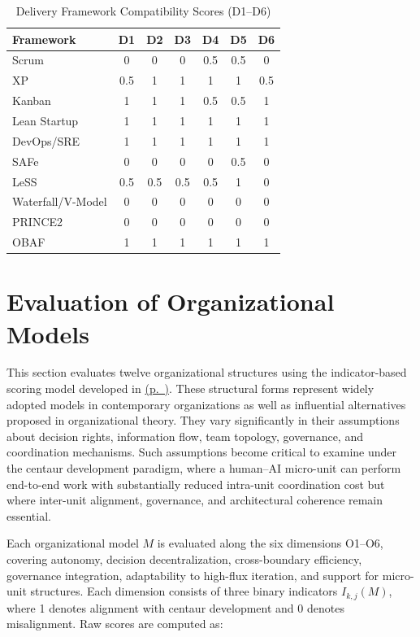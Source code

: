 \documentclass[11pt, a4paper, twocolumn]{article} %
\newcommand{\namerefp}[1]{\hyperref[#1]{\nameref{#1} (p.~\pageref{#1})}}
\begin{document}
\begin{table}[h]
\centering
\caption{Delivery Framework Compatibility Scores (D1--D6)}
\label{tab:delivery-scores}
\begin{tabular}{lcccccc}
\toprule
\textbf{Framework} & D1 & D2 & D3 & D4 & D5 & D6 \\
\midrule
Scrum              & 0   & 0   & 0   & 0.5 & 0.5 & 0   \\
XP                 & 0.5 & 1   & 1   & 1   & 1   & 0.5 \\
Kanban             & 1   & 1   & 1   & 0.5 & 0.5 & 1   \\
Lean Startup       & 1   & 1   & 1   & 1   & 1   & 1   \\
DevOps/SRE         & 1   & 1   & 1   & 1   & 1   & 1   \\
SAFe               & 0   & 0   & 0   & 0   & 0.5 & 0   \\
LeSS               & 0.5 & 0.5 & 0.5 & 0.5 & 1   & 0   \\
Waterfall/V-Model  & 0   & 0   & 0   & 0   & 0   & 0   \\
PRINCE2            & 0   & 0   & 0   & 0   & 0   & 0   \\
OBAF               & 1   & 1   & 1   & 1   & 1   & 1   \\
\bottomrule
\end{tabular}
\end{table}

\clearpage

\section*{Evaluation of Organizational Models}
\label{sec:org-eval}

This section evaluates twelve organizational structures using the indicator-based
scoring model developed in \namerefp{sec:org-dimensions}. These structural
forms represent widely adopted models in contemporary organizations as well as
influential alternatives proposed in organizational theory. They vary
significantly in their assumptions about decision rights, information flow,
team topology, governance, and coordination mechanisms. Such assumptions become
critical to examine under the centaur development paradigm, where a
human--AI micro-unit can perform end-to-end work with substantially reduced
intra-unit coordination cost but where inter-unit alignment, governance, and
architectural coherence remain essential.

Each organizational model $M$ is evaluated along the six dimensions O1--O6,
covering autonomy, decision decentralization, cross-boundary efficiency,
governance integration, adaptability to high-flux iteration, and support for
micro-unit structures. Each dimension consists of three binary indicators
$I_{k,j}(M)$, where 1 denotes alignment with centaur development and 0 denotes
misalignment. Raw scores are computed as:
\end{document}
